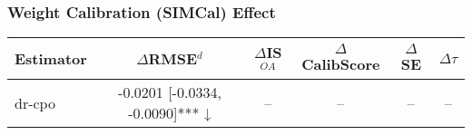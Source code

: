 \subsubsection{Weight Calibration (SIMCal) Effect}
\begin{tabular}{l|ccccc}
\toprule
Estimator & $\Delta$RMSE$^d$ & $\Delta$IS$^{OA}$ & $\Delta$CalibScore & $\Delta$SE & $\Delta\tau$ \\
\midrule
dr-cpo & -0.0201 [-0.0334, -0.0090]*** ↓ & -- & -- & -- & -- \\
\bottomrule
\end{tabular}